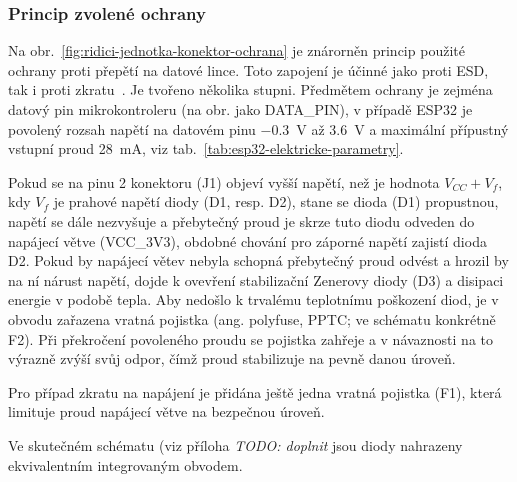         \subsubsection{Princip zvolené ochrany}
        Na obr.~\ref{fig:ridici-jednotka-konektor-ochrana} je znárorněn princip použité ochrany proti přepětí na datové lince. Toto zapojení je účinné jako proti ESD, tak i proti zkratu~\cite{altium-esd-protection}. Je tvořeno několika stupni. Předmětem ochrany je zejména datový pin mikrokontroleru (na obr. jako DATA\_PIN), v případě ESP32 je povolený rozsah napětí na datovém pinu \qty{-0.3}{V} až \qty{3.6}{V} a maximální přípustný vstupní proud \qty{28}{mA}, viz tab.~\ref{tab:esp32-elektricke-parametry}.

        Pokud se na pinu 2 konektoru (J1) objeví vyšší napětí, než je hodnota \(V_{CC} +V_{f} \), kdy \(V_{f} \) je prahové napětí diody (D1, resp. D2), stane se dioda (D1) propustnou, napětí se dále nezvyšuje a přebytečný proud je skrze tuto diodu odveden do napájecí větve (VCC\_3V3), obdobné chování pro záporné napětí zajistí dioda D2. Pokud by napájecí větev nebyla schopná přebytečný proud odvést a hrozil by na ní nárust napětí, dojde k ovevření stabilizační Zenerovy diody (D3) a disipaci energie v podobě tepla. Aby nedošlo k trvalému teplotnímu poškození diod, je v obvodu zařazena vratná pojistka (ang. polyfuse, PPTC; ve schématu konkrétně F2). Při překročení povoleného proudu se pojistka zahřeje a v návaznosti na to výrazně zvýší svůj odpor, čímž proud stabilizuje na pevně danou úroveň.

        Pro případ zkratu na napájení je přidána ještě jedna vratná pojistka (F1), která limituje proud napájecí větve na bezpečnou úroveň.

        Ve skutečném schématu (viz příloha \textit{TODO: doplnit} jsou diody nahrazeny ekvivalentním integrovaným obvodem.

